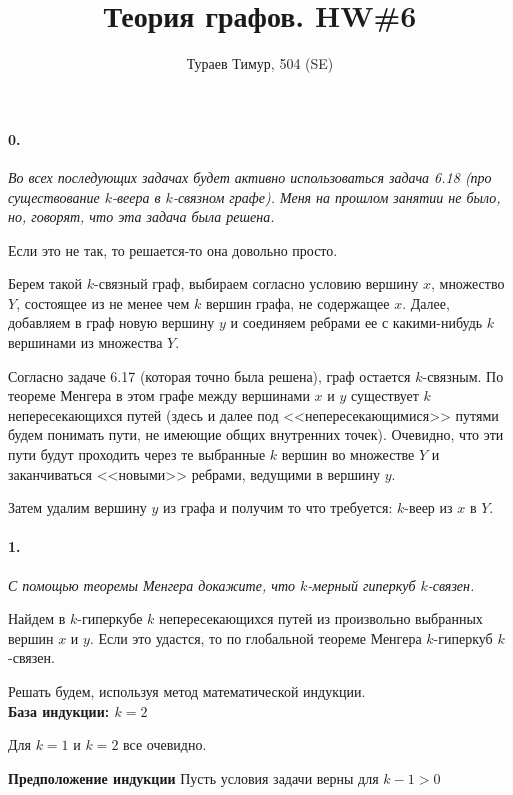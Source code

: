 \documentclass[russian]{article}
\begin{document}
\title{Теория графов. HW\#6}
\author{Тураев Тимур, 504 (SE)}

\maketitle

\paragraph{0.} \textit{Во всех последующих задачах будет активно использоваться задача 6.18 (про существование $k$-веера в $k$-связном графе). Меня на прошлом занятии не было, но, говорят, что эта задача была решена.}

Если это не так, то решается-то она довольно просто. 

Берем такой $k$-связный граф, выбираем согласно условию вершину $x$, множество $Y$, состоящее из не менее чем $k$ вершин графа, не содержащее $x$. Далее, добавляем в граф новую вершину $y$ и соединяем ребрами ее с какими-нибудь $k$ вершинами из множества $Y$.

Согласно задаче 6.17 (которая точно была решена), граф остается $k$-связным. По теореме Менгера в этом графе между вершинами $x$ и $y$ существует $k$ непересекающихся путей (здесь и далее под <<непересекающимися>> путями будем понимать пути, не имеющие общих внутренних точек). Очевидно, что эти пути будут проходить через те выбранные $k$ вершин во множестве $Y$ и заканчиваться <<новыми>> ребрами, ведущими в вершину $y$.

Затем удалим вершину $y$ из графа и получим то что требуется: $k$-веер из $x$ в $Y$.

\paragraph{1.} \textit{С помощью теоремы Менгера докажите, что $k$-мерный гиперкуб $k$-связен.}

Найдем в $k$-гиперкубе $k$ непересекающихся путей из произвольно выбранных вершин $x$ и $y$. Если это удастся, то по глобальной теореме Менгера $k$-гиперкуб $k$-связен.

Решать будем, используя метод математической индукции.\\

\textbf{База индукции: $k=2$}

Для $k=1$ и $k=2$ все очевидно.

\textbf{Предположение индукции} Пусть условия задачи верны для $k-1 > 0$
\end{document}
